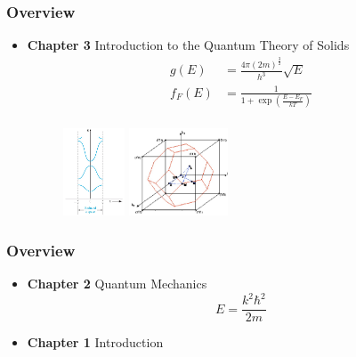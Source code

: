 \documentclass{beamer}
\begin{document}
    \begin{frame} \frametitle{Overview}
        \begin{itemize}
            \item \textbf{Chapter 3} Introduction to the Quantum Theory of Solids
                \begin{equation*}
                    \begin{aligned}
                        g(E) &= \frac{4 \pi (2m)^{\frac{3}{2} }}{h^3} \sqrt{E}  \\
                        f_F(E) &= \frac{1}{1 + \exp\left( \frac{E - E_F}{kT}  \right)} \\
                    \end{aligned}
                \end{equation*}
                \begin{figure}[H]
                    \centering
                    \includegraphics[height=7em]{E-k-diagram.jpg}
                    \includegraphics[height=7em]{3D-structure.jpg}
                    \label{fig:E-k-diagram.jpg}
                \end{figure}
        \end{itemize}
    \end{frame}

    \begin{frame} \frametitle{Overview}
        \begin{itemize}
            \item \textbf{Chapter 2} Quantum Mechanics
                \begin{equation*}
                    E = \frac{k^2 \hbar^2}{2m} 
                \end{equation*}

            \item \textbf{Chapter 1} Introduction
        \end{itemize}
    \end{frame}
\end{document}
